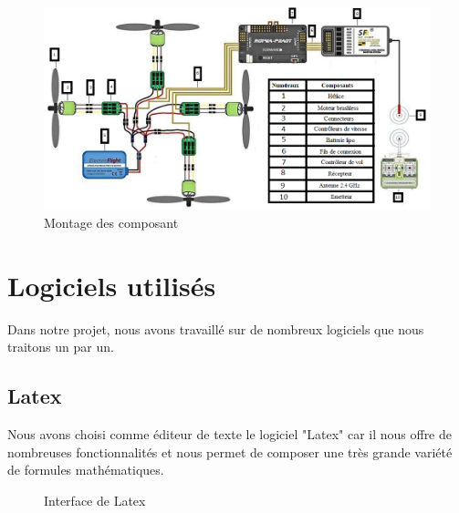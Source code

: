 	\begin{figure} [H]
		\begin{center}
			\centering
			\hspace*{-1cm}\includegraphics[width=1.1\linewidth]{Images/Shéma électrique}
		\end{center}
		\caption{Montage des composant}
	\end{figure}
	\section{Logiciels utilisés}
	Dans notre projet, nous avons travaillé sur de nombreux logiciels que nous traitons un par un.
	\subsection{Latex}
	Nous avons choisi comme éditeur de texte le logiciel "Latex" car il nous  offre de nombreuses fonctionnalités et nous permet de composer une très grande variété de formules mathématiques.
	\begin{figure}[H]
		\begin{center}
			\centering
		\end{center}
		\caption{Interface de Latex}
	\end{figure}
